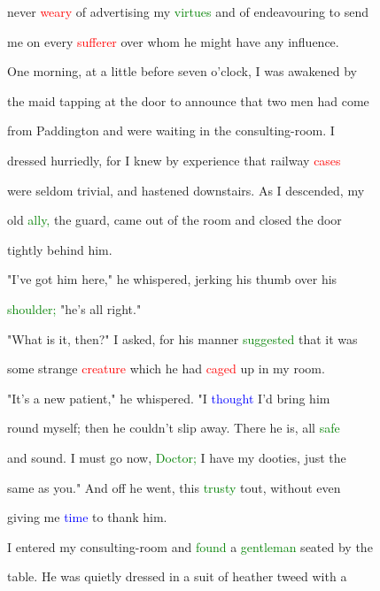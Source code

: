  never \textcolor{red}{weary} of advertising my \textcolor{green}{virtues} and of endeavouring to send

 me on every \textcolor{red}{sufferer} over whom he might have any \textcolor{BurntOrange}{influence.}



 One morning, at a little before seven o'clock, I was awakened by

 the maid tapping at the door to announce that two men had come

 from Paddington and were \textcolor{BurntOrange}{waiting} in the consulting-room. I

 dressed hurriedly, for I knew by experience that railway \textcolor{red}{cases}

 were seldom trivial, and hastened downstairs. As I descended, my

 old \textcolor{green}{ally,} the \textcolor{BurntOrange}{guard,} came out of the room and closed the door

 tightly behind him.



 "I've got him here," he whispered, jerking his thumb over his

 \textcolor{green}{shoulder;} "he's all right."



 "What is it, then?" I asked, for his manner \textcolor{green}{suggested} that it was

 some strange \textcolor{red}{creature} which he had \textcolor{red}{caged} up in my room.



 "It's a new \textcolor{BurntOrange}{patient,"} he whispered. "I \textcolor{blue}{thought} I'd bring him

 round myself; then he couldn't \textcolor{BurntOrange}{slip} away. There he is, all \textcolor{green}{safe}

 and sound. I must go now, \textcolor{green}{Doctor;} I have my dooties, just the

 same as you." And off he went, this \textcolor{green}{trusty} tout, without even

 giving me \textcolor{blue}{time} to thank him.



 I entered my consulting-room and \textcolor{green}{found} a \textcolor{green}{gentleman} seated by the

 table. He was quietly dressed in a suit of heather tweed with a

